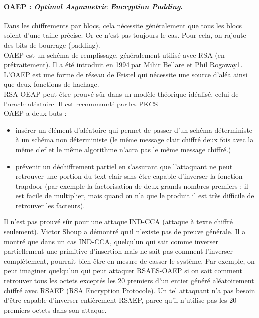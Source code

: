 \paragraph{OAEP : \textit{Optimal Asymmetric Encryption Padding}. \\}
Dans les chiffrements par blocs, cela nécessite généralement que tous les blocs soient d'une taille précise. Or ce n'est pas toujours le cas. Pour cela, on rajoute des bits de bourrage (padding).\\
OAEP est un schéma de remplissage, généralement utilisé avec RSA (en prétraitement). Il a été introduit en 1994 par Mihir Bellare et Phil Rogaway1. L'OAEP est une forme de réseau de Feistel qui nécessite une source d'aléa ainsi que deux fonctions de hachage.\\
RSA-OEAP peut être prouvé sûr dans un modèle théorique idéalisé, celui de l'oracle aléatoire. Il est recommandé par les PKCS.\\
OAEP a deux buts :
\begin{itemize}
\item insérer un élément d'aléatoire qui permet de passer d'un schéma déterministe à un schéma non déterministe (le même message clair chiffré deux fois avec la même clef et le même algorithme n'aura pas le même message chiffré.)
\item prévenir un déchiffrement partiel en s'assurant que l'attaquant ne peut retrouver une portion du text clair sans être capable d'inverser la fonction trapdoor (par exemple la factorisation de deux grands nombres premiers : il est facile de multiplier, mais quand on n'a que le produit il est très difficile de retrouver les facteurs).\\
\end{itemize}
Il n'est pas prouvé sûr pour une attaque IND-CCA (attaque à texte chiffré seulement). Victor Shoup a démontré qu'il n'existe pas de preuve générale.
Il a montré que dans un cas IND-CCA, quelqu'un qui sait comme inverser partiellement une primitive d'insertion mais ne sait pas comment l'inverser complètement, pourrait bien être en mesure de casser le système. Par exemple, on peut imaginer quelqu'un qui peut attaquer RSAES-OAEP si on sait comment retrouver tous les octets exceptés les 20 premiers d'un entier généré aléatoirement chiffré avec RSAEP (RSA Encryption Protocole). Un tel attaquant n'a pas besoin d'être capable d'inverser entièrement RSAEP, parce qu'il n'utilise pas les 20 premiers octets dans son attaque.


